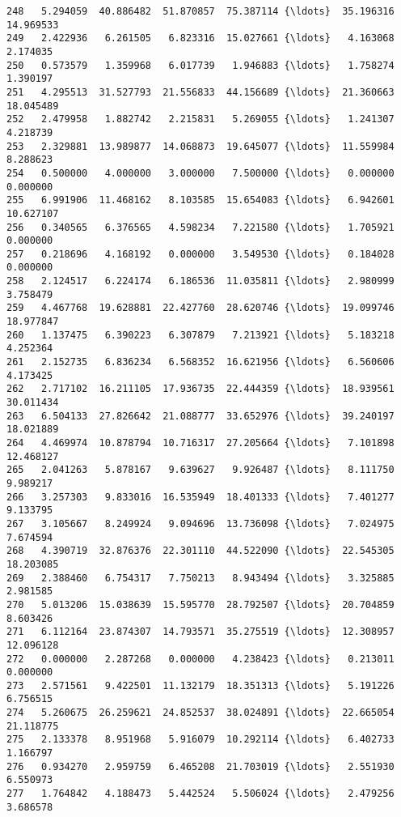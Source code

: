 \documentclass[11pt]{article}
\begin{document}
\begin{Verbatim}[commandchars=\\\{\}]
248   5.294059  40.886482  51.870857  75.387114 {\ldots}  35.196316  14.969533   
249   2.422936   6.261505   6.823316  15.027661 {\ldots}   4.163068   2.174035   
250   0.573579   1.359968   6.017739   1.946883 {\ldots}   1.758274   1.390197   
251   4.295513  31.527793  21.556833  44.156689 {\ldots}  21.360663  18.045489   
252   2.479958   1.882742   2.215831   5.269055 {\ldots}   1.241307   4.218739   
253   2.329881  13.989877  14.068873  19.645077 {\ldots}  11.559984   8.288623   
254   0.500000   4.000000   3.000000   7.500000 {\ldots}   0.000000   0.000000   
255   6.991906  11.468162   8.103585  15.654083 {\ldots}   6.942601  10.627107   
256   0.340565   6.376565   4.598234   7.221580 {\ldots}   1.705921   0.000000   
257   0.218696   4.168192   0.000000   3.549530 {\ldots}   0.184028   0.000000   
258   2.124517   6.224174   6.186536  11.035811 {\ldots}   2.980999   3.758479   
259   4.467768  19.628881  22.427760  28.620746 {\ldots}  19.099746  18.977847   
260   1.137475   6.390223   6.307879   7.213921 {\ldots}   5.183218   4.252364   
261   2.152735   6.836234   6.568352  16.621956 {\ldots}   6.560606   4.173425   
262   2.717102  16.211105  17.936735  22.444359 {\ldots}  18.939561  30.011434   
263   6.504133  27.826642  21.088777  33.652976 {\ldots}  39.240197  18.021889   
264   4.469974  10.878794  10.716317  27.205664 {\ldots}   7.101898  12.468127   
265   2.041263   5.878167   9.639627   9.926487 {\ldots}   8.111750   9.989217   
266   3.257303   9.833016  16.535949  18.401333 {\ldots}   7.401277   9.133795   
267   3.105667   8.249924   9.094696  13.736098 {\ldots}   7.024975   7.674594   
268   4.390719  32.876376  22.301110  44.522090 {\ldots}  22.545305  18.203085   
269   2.388460   6.754317   7.750213   8.943494 {\ldots}   3.325885   2.981585   
270   5.013206  15.038639  15.595770  28.792507 {\ldots}  20.704859   8.603426   
271   6.112164  23.874307  14.793571  35.275519 {\ldots}  12.308957  12.096128   
272   0.000000   2.287268   0.000000   4.238423 {\ldots}   0.213011   0.000000   
273   2.571561   9.422501  11.132179  18.351313 {\ldots}   5.191226   6.756515   
274   5.260675  26.259621  24.852537  38.024891 {\ldots}  22.665054  21.118775   
275   2.133378   8.951968   5.916079  10.292114 {\ldots}   6.402733   1.166797   
276   0.934270   2.959759   6.465208  21.703019 {\ldots}   2.551930   6.550973   
277   1.764842   4.188473   5.442524   5.506024 {\ldots}   2.479256   3.686578   


\end{Verbatim}
\end{document}
